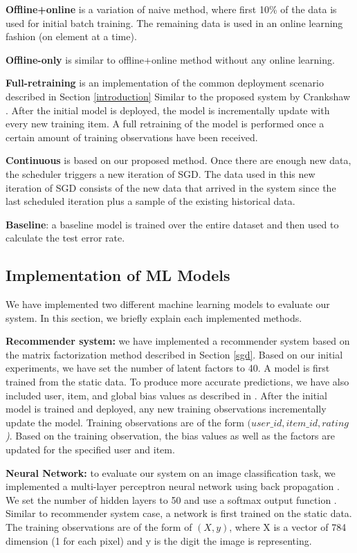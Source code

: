 \documentclass{vldb}
\begin{document}
\textbf{Offline+online} is a variation of naive method, where first 10\% of the data is used for initial batch training.
The remaining data is used in an online learning fashion (on element at a time). 

\textbf{Offline-only} is similar to offline+online method without any online learning.

\textbf{Full-retraining} is an implementation of the common deployment scenario described in Section \ref{introduction}
Similar to the proposed system by Crankshaw \cite{crankshaw2014missing}. 
After the initial model is deployed, the model is incrementally update with every new training item.
A full retraining of the model is performed once a certain amount of training observations have been received.

\textbf{Continuous} is based on our proposed method. 
Once there are enough new data, the scheduler triggers a new iteration of SGD. 
The data used in this new iteration of SGD consists of the new data that arrived in the system since the last scheduled iteration plus a sample of the existing historical data.

\textbf{Baseline}: a baseline model is trained over the entire dataset and then used to calculate the test error rate. 

\subsection{Implementation of ML Models}
We have implemented two different machine learning models to evaluate our system.
In this section, we briefly explain each implemented methods.

\textbf{Recommender system:} we have implemented a recommender system based on the matrix factorization method described in Section \ref{sgd}.
Based on our initial experiments, we have set the number of latent factors to 40.
A model is first trained from the static data.
To produce more accurate predictions, we have also included user, item, and global bias values as described in \cite{koren2009matrix}.
After the initial model is trained and deployed, any new training observations incrementally update the model.
Training observations are of the form \textit{\((user\_id, item\_id, rating\))}.
Based on the training observation, the bias values as well as the factors are updated for the specified user and item.

\textbf{Neural Network:} to evaluate our system on an image classification task, we implemented a multi-layer perceptron neural network using back propagation \cite{collobert2004links}.
We set the number of hidden layers to 50 and use a softmax output function \cite{bishop2006pattern}.
Similar to recommender system case, a network is first trained on the static data.
The training observations are of the form of \textit{\((X,y)\)}, where X is a vector of 784 dimension (1 for each pixel) and y is the digit the image is representing.
\end{document}
